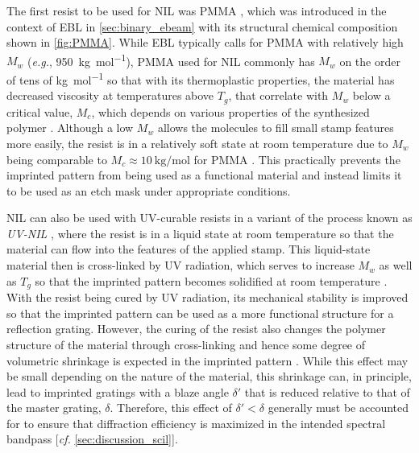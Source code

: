 The first resist to be used for NIL was PMMA \cite{Chou96}, which was introduced in the context of EBL in \cref{sec:binary_ebeam} with its structural chemical composition shown in \cref{fig:PMMA}. 
While EBL typically calls for PMMA with relatively high $M_w$ (\emph{e.g.}, \SI{950}{\kilogram\per\mole}), PMMA used for NIL commonly has $M_w$ on the order of tens of \si{\kilogram\per\mole} so that with its thermoplastic properties, the material has decreased viscosity at temperatures above $T_g$, that correlate with $M_w$ below a critical value, $M_c$, which depends on various properties of the synthesized polymer \cite{Fuchs96,Geng16,Schift10,Kirchner19}. 
Although a low $M_w$ allows the molecules to fill small stamp features more easily, the resist is in a relatively soft state at room temperature due to $M_w$ being comparable to $M_c \approx \SI{10}{\kilogram\per\mole}$ for PMMA \cite{Schift10,Schleunitz10,Kirchner19}. 
This practically prevents the imprinted pattern from being used as a functional material and instead limits it to be used as an etch mask under appropriate conditions. 

NIL can also be used with UV-curable resists in a variant of the process known as \emph{UV-NIL} \cite{Haisma96}, where the resist is in a liquid state at room temperature so that the material can flow into the features of the applied stamp. 
This liquid-state material then is cross-linked by UV radiation, which serves to increase $M_w$ as well as $T_g$ so that the imprinted pattern becomes solidified at room temperature \cite{Schift08,Schift10}. 
With the resist being cured by UV radiation, its mechanical stability is improved so that the imprinted pattern can be used as a more functional structure for a reflection grating. 
However, the curing of the resist also changes the polymer structure of the material through cross-linking and hence some degree of volumetric shrinkage is expected in the imprinted pattern \cite{Horiba_2012}. 
While this effect may be small depending on the nature of the material, this shrinkage can, in principle, lead to imprinted gratings with a blaze angle $\delta'$ that is reduced relative to that of the master grating, $\delta$. 
Therefore, this effect of $\delta' < \delta$ generally must be accounted for to ensure that diffraction efficiency is maximized in the intended spectral bandpass [\emph{cf.\@} \cref{sec:discussion_scil}]. 

